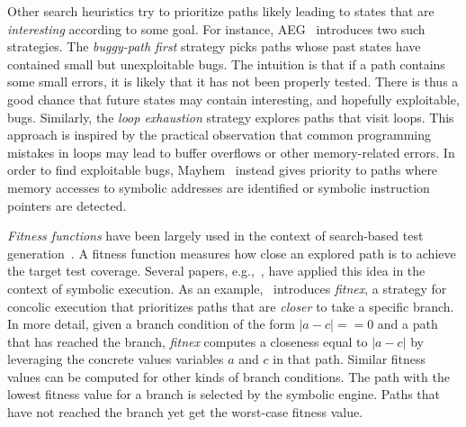 
Other search heuristics try to prioritize paths likely leading to states that are {\em interesting} according to some goal. For instance, {\sc AEG}~\cite{AEG-NDSS11} introduces two such strategies. The {\em buggy-path first} strategy picks paths whose past states have contained small but unexploitable bugs. The intuition is that if a path contains some small errors, it is likely that it has not been properly tested. There is thus a good chance that future states may contain interesting, and hopefully exploitable, bugs. Similarly, the {\em loop exhaustion} strategy explores paths that visit loops. This approach is inspired by the practical observation that common programming mistakes in loops may lead to buffer overflows or other memory-related errors. In order to find exploitable bugs, {\sc Mayhem}~\cite{MAYHEM-SP12} instead gives priority to paths where memory accesses to symbolic addresses are identified or symbolic instruction pointers are detected. 

{\em Fitness functions} have been largely used in the context of search-based test generation~\cite{M-STVR04}. %
A fitness function measures how close an explored path is to achieve the target test coverage. Several papers, e.g.,~\cite{XTD-DSN09,CS-CACM13}, have applied this idea in the context of symbolic execution. As an example,~\cite{XTD-DSN09} introduces {\em fitnex}, a strategy for concolic execution that prioritizes paths that are {\em closer} to take a specific branch. In more detail, given a branch condition of the form $|a - c| == 0$ and a   path that has reached the branch, {\em fitnex} computes a closeness equal to $|a - c|$ by leveraging the concrete values  variables $a$ and $c$ in that path. Similar fitness values can be computed for other kinds of branch conditions. The path with the lowest fitness value for a branch is selected by the symbolic engine. Paths that have not reached the branch yet get the worst-case fitness value. 

